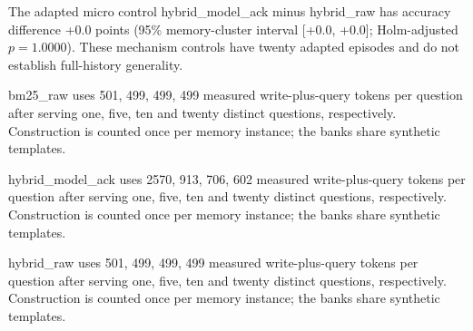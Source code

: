 The adapted micro control hybrid\_model\_ack minus hybrid\_raw has accuracy difference +0.0 points (95\% memory-cluster interval [+0.0, +0.0]; Holm-adjusted $p=1.0000$). These mechanism controls have twenty adapted episodes and do not establish full-history generality.

bm25\_raw uses 501, 499, 499, 499 measured write-plus-query tokens per question after serving one, five, ten and twenty distinct questions, respectively. Construction is counted once per memory instance; the banks share synthetic templates.

hybrid\_model\_ack uses 2570, 913, 706, 602 measured write-plus-query tokens per question after serving one, five, ten and twenty distinct questions, respectively. Construction is counted once per memory instance; the banks share synthetic templates.

hybrid\_raw uses 501, 499, 499, 499 measured write-plus-query tokens per question after serving one, five, ten and twenty distinct questions, respectively. Construction is counted once per memory instance; the banks share synthetic templates.

